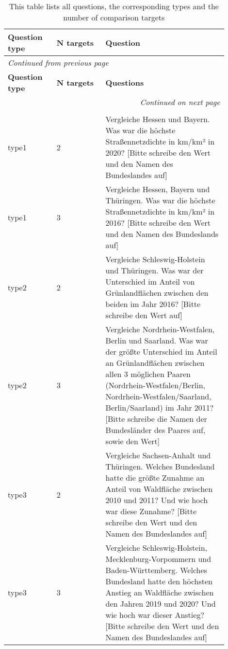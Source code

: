 \begin{longtable}{| p{0.20\linewidth} | p{0.20\linewidth} | p{0.50\linewidth}|}
    \hline
    \textbf{Question type} & \textbf{N targets} & \textbf{Question} \\
    \hline
    \endfirsthead
    \multicolumn{3}{l}{{\textit{Continued from previous page}}} \\
    \hline
    \textbf{Question type} & \textbf{N targets} & \textbf{Questions} \\
    \hline
    \endhead
    \hline \multicolumn{3}{r}{{\textit{Continued on next page}}} \\
    \endfoot
    \hline
    \caption{This table lists all questions, the corresponding types and the number of comparison targets \label{questionsTable}}\\
    \endlastfoot
    type1 & 2 & \parbox{\linewidth}{\vspace{4pt} Vergleiche Hessen und Bayern. Was war die höchste Straßennetzdichte in km/km² in 2020? [Bitte schreibe den Wert und den Namen des Bundeslandes auf]} \\
    \hline
    type1 & 3 & \parbox{\linewidth}{\vspace{4pt} Vergleiche Hessen, Bayern und Thüringen. Was war die höchste Straßennetzdichte in km/km² in 2016? [Bitte schreibe den Wert und den Namen des Bundeslands auf]} \\
    \hline
    type2 & 2 & \parbox{\linewidth}{\vspace{4pt} Vergleiche Schleswig-Holstein und Thüringen. Was war der Unterschied im Anteil von Grünlandflächen zwischen den beiden im Jahr 2016? [Bitte schreibe den Wert auf]} \\
    \hline
    type2 & 3 & \parbox{\linewidth}{\vspace{4pt} Vergleiche Nordrhein-Westfalen, Berlin und Saarland. Was war der größte Unterschied im Anteil an Grünlandflächen zwischen allen 3 möglichen Paaren (Nordrhein-Westfalen/Berlin, Nordrhein-Westfalen/Saarland, Berlin/Saarland) im Jahr 2011? [Bitte schreibe die Namen der Bundesländer des Paares auf, sowie den Wert]} \\
    \hline
    type3 & 2 & \parbox{\linewidth}{\vspace{4pt} Vergleiche Sachsen-Anhalt und Thüringen. Welches Bundesland hatte die größte Zunahme an Anteil von Waldfläche zwischen 2010 und 2011? Und wie hoch war diese Zunahme? [Bitte schreibe den Wert und den Namen des Bundeslandes auf]} \\
    \hline
    type3 & 3 & \parbox{\linewidth}{\vspace{4pt} Vergleiche Schleswig-Holstein, Mecklenburg-Vorpommern und Baden-Württemberg. Welches Bundesland hatte den höchsten Anstieg an Waldfläche zwischen den Jahren 2019 und 2020? Und wie hoch war dieser Anstieg? [Bitte schreibe den Wert und den Namen des Bundeslandes auf]} \\

\end{longtable}
